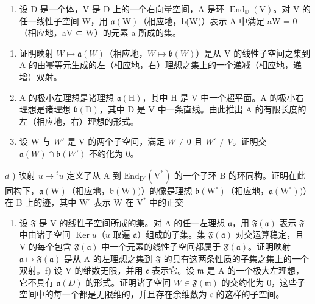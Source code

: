 
\begin{enumerate}
\def\labelenumi{\arabic{enumi})}
\tightlist
\item
  设 D 是一个体，V 是 D 上的一个右向量空间，A 是环 \(\operatorname{End}_{\mathbb{D}}(\mathrm{V})\)。对 V 的任一线性子空间 W，用 \(\mathfrak{a}(\mathrm{W})\)（相应地，b(W)）表示 A 中满足 aW = 0（相应地，aV ⊂ W）的元素 a 所成的集。
\end{enumerate}

\begin{enumerate}
\def\labelenumi{\alph{enumi})}
\item
  证明映射 \(W \mapsto \mathfrak{a}(W)\)（相应地，\(W \mapsto \mathfrak{b}(W)\)）是从 V 的线性子空间之集到 A 的由幂等元生成的左（相应地，右）理想之集上的一个递减（相应地，递增）双射。
\item
  A 的极小左理想是诸理想 \(\mathfrak{a}(\mathrm{H})\)，其中 H 是 V 中一个超平面。A 的极小右理想是诸理想 \(\mathfrak{b}(\mathrm{D})\)，其中 D 是 V 中一条直线。由此推出 A 的有限长度的左（相应地，右）理想的形式。
\item
  设 W 与 \(W'\) 是 V 的两个子空间，满足 \(W \neq 0\) 且 \(W' \neq V\)。证明交 \(\mathfrak{a}(W) \cap \mathfrak{b}(W')\) 不约化为 0。
\end{enumerate}

\(d\) ) 映射 \(u\mapsto{}^{t}u\) 定义了从 A 到 \(\mathrm{End}_{\mathrm{D}^{\circ}}(\mathrm{V}^{*})\) 的一个子环 B 的环同构。证明在此同构下，\(\mathfrak{a}(\mathrm{W})\)（相应地，\(\mathfrak{b}(\mathrm{W}))\)）的像是理想 \(\mathfrak{b}(\mathrm{W}^{\circ})\)（相应地，\(\mathfrak{a}(\mathrm{W}^{\circ}))\)）在 B 上的迹，其中 \(\mathrm{W}^{\circ}\) 表示 W 在 \(\mathrm{V}^*\) 中的正交

\begin{enumerate}
\def\labelenumi{\alph{enumi})}
\setcounter{enumi}{4}
\tightlist
\item
  设 \(\mathfrak{F}\) 是 V 的线性子空间所成的集。对 A 的任一左理想 \(\mathfrak{a}\)，用 \(\mathfrak{F}(\mathfrak{a})\) 表示 \(\mathfrak{F}\) 中由诸子空间 \(\operatorname{Ker} u\)（\(u\) 取遍 \(\mathfrak{a}\)）组成的子集。集 \(\mathfrak{F}(\mathfrak{a})\) 对交运算稳定，且 V 的每个包含 \(\mathfrak{F}(\mathfrak{a})\) 中一个元素的线性子空间都属于 \(\mathfrak{F}(\mathfrak{a})\)。证明映射 \(\mathfrak{a} \mapsto \mathfrak{F}(\mathfrak{a})\) 是从 A 的左理想之集到 \(\mathfrak{F}\) 的具有这两条性质的子集之集上的一个双射。f) 设 V 的维数无限，并用 \(\mathfrak{c}\) 表示它。设 \(\mathfrak{m}\) 是 A 的一个极大左理想，它不具有 \(\mathfrak{a}(D)\) 的形式。证明诸子空间 \(W \in \mathfrak{F}(\mathfrak{m})\) 的交约化为 0，这些子空间中的每一个都是无限维的，并且存在余维数为 \(\mathfrak{c}\) 的这样的子空间。
\end{enumerate}

